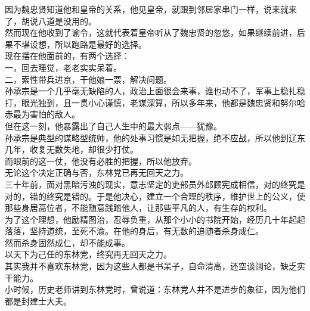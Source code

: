 \begin{multicols}{\theparacolNo}
因为魏忠贤知道他和皇帝的关系，他见皇帝，就跟到邻居家串门一样，说来就来了，胡说八道是没用的。\\

然而现在他收到了谕令，这就代表着皇帝听从了魏忠贤的忽悠，如果继续前进，后果不堪设想，所以跑路是最好的选择。\\

现在摆在他面前的，有两个选择：\\

一，回去睡觉，老老实实呆着。\\

二，索性带兵进京，干他娘一票，解决问题。\\

孙承宗是一个几乎毫无缺陷的人，政治上面很会来事，谁也动不了，军事上稳扎稳打，眼光独到，且一贯小心谨慎，老谋深算，所以多年来，他都是魏忠贤和努尔哈赤最为害怕的敌人。\\

但在这一刻，他暴露出了自己人生中的最大弱点——犹豫。\\

孙承宗是典型的谋略型统帅，他的处事习惯是如无把握，绝不应战，所以他到辽东几年，收复无数失地，却很少打仗。\\

而眼前的这一仗，他没有必胜的把握，所以他放弃。\\

无论这个决定正确与否，东林党已再无回天之力。\\

三十年前，面对黑暗污浊的现实，意志坚定的吏部员外郎顾宪成相信，对的终究是对的，错的终究是错的。于是他决心，建立一个合理的秩序，维护世上的公义，使那些身居高位者，不能随意践踏他人，让那些平凡的人，有生存的权利。\\

为了这个理想，他励精图治，忍辱负重，从那个小小的书院开始，经历几十年起起落落，坚持道统，至死不渝。在他的身后，有无数的追随者杀身成仁。\\

然而杀身固然成仁，却不能成事。\\

以天下为己任的东林党，终究再无回天之力。\\

其实我并不喜欢东林党，因为这些人都是书呆子，自命清高，还空谈阔论，缺乏实干能力。\\

小时候，历史老师讲到东林党时，曾说道：东林党人并不是进步的象征，因为他们都是封建士大夫。\\


\end{multicols}
